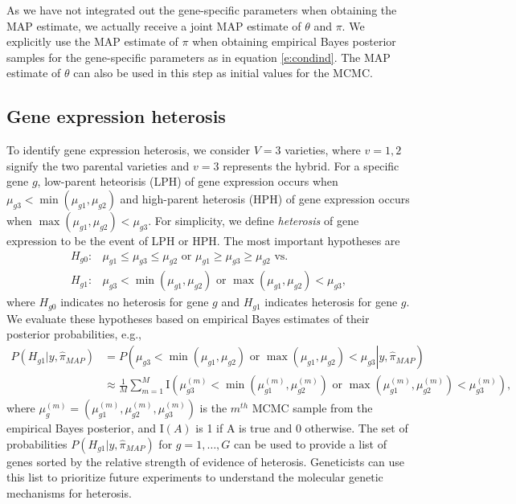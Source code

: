 \documentclass[useAMS,usenatbib,referee]{biom}
\begin{document}
As we have not integrated out the gene-specific parameters when obtaining the MAP estimate, we actually receive a joint MAP estimate of $\theta$ and $\pi$. We explicitly use the MAP estimate of $\pi$ when obtaining empirical Bayes posterior samples for the gene-specific parameters as in equation \eqref{e:condind}. The MAP estimate of $\theta$ can also be used in this step as initial values for the MCMC. 

\subsection{Gene expression heterosis}
\label{s:gene_heterosis}

To identify gene expression heterosis, we consider $V=3$ varieties, where  $v=1,2$ signify the two parental varieties and $v=3$ represents the hybrid. For a specific gene $g$, low-parent  heteorisis (LPH) of gene expression occurs when $\mu_{g3}< \min(\mu_{g1},\mu_{g2})$ 
and high-parent  heterosis (HPH) of gene expression occurs when $\max(\mu_{g1},\mu_{g2}) < \mu_{g3}$. For simplicity, we define \emph{ heterosis} of gene expression to be the event of LPH or HPH. The most important hypotheses are
\begin{align}
H_{g0}:&\mu_{g1}\le \mu_{g3}\le \mu_{g2} \mbox{ or } \mu_{g1}\ge \mu_{g3}\ge \mu_{g2} \mbox{\ \ vs.\ \ } \nonumber \\
H_{g1}:&\mu_{g3}< \min(\mu_{g1},\mu_{g2}) \mbox{ or } \max(\mu_{g1},\mu_{g2}) < \mu_{g3},
\label{e:hypotheses}
\end{align}
where $H_{g0}$ indicates no heterosis for gene $g$ and $H_{g1}$ indicates  heterosis for gene $g$. 
We evaluate these hypotheses based on empirical Bayes estimates of their posterior probabilities, e.g., 
\begin{align}
P\left(H_{g1}|y, \hat{\pi}_{MAP}\right) &= P\left(\left.\mu_{g3}< \min(\mu_{g1},\mu_{g2}) \mbox{ or } \max(\mu_{g1},\mu_{g2}) < \mu_{g3}\right| y, \hat{\pi}_{MAP}\right) \nonumber \\
&\approx \frac{1}{M} \sum_{m=1}^M \mathrm{I}\left(\mu_{g3}^{(m)}< \min\left(\mu_{g1}^{(m)},\mu_{g2}^{(m)}\right) \mbox{ or } \max\left(\mu_{g1}^{(m)},\mu_{g2}^{(m)}\right) < \mu_{g3}^{(m)}\right), \label{e:probs}
\end{align}
where $\mu_g^{(m)} = \left(\mu_{g1}^{(m)},\mu_{g2}^{(m)},\mu_{g3}^{(m)}\right)$ is the $m^{th}$ MCMC sample from the empirical Bayes posterior, and $\mathrm{I}(A)$ is 1 if A is true and 0 otherwise. The set of probabilities $P\left(H_{g1}|y, \hat{\pi}_{MAP}\right)$ for $g=1,\ldots,G$ can be used to provide a list of genes sorted by the relative strength of evidence of  heterosis. Geneticists can use this list to prioritize future experiments to understand the molecular genetic mechanisms for heterosis.  
 
\end{document}

